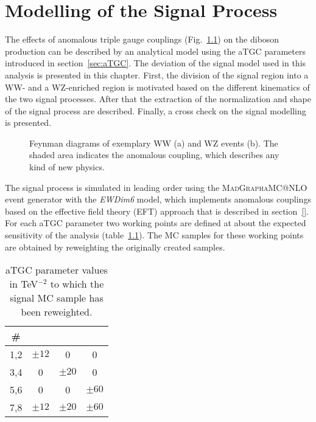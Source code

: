 \chapter{Modelling of the Signal Process}
\label{chap:signal}
The effects of anomalous triple gauge couplings (Fig.~\ref{fig:signal:fy_atgc}) on the diboson production can be described by an analytical model using the aTGC parameters introduced in section~\ref{sec:aTGC}. The deviation of the signal model used in this analysis is presented in this chapter. First, the division of the signal region into a WW- and a WZ-enriched region is motivated based on the different kinematics of the two signal processes. After that the extraction of the normalization and shape of the signal process are described. Finally, a cross check on the signal modelling is presented.\\
\begin{figure}
	\centering
	\caption[Feynman diagrams of two exemplary signal events]{Feynman diagrams of exemplary WW (a) and WZ events (b). The shaded area indicates the anomalous coupling, which describes any kind of new physics.}
	\label{fig:signal:fy_atgc}
\end{figure}

\noindent The signal process is simulated in leading order using the \textsc{MadGraph\textunderscore aMC@NLO} event generator with the \textit{EWDim6} model, which implements anomalous couplings based on the effective field theory (EFT) approach that is described in section~\ref{}. For each aTGC parameter two working points are defined at about the expected sensitivity of the analysis (table~\ref{tab:signal:aTGCpoints}). The MC samples for these working points are obtained by reweighting the originally created samples.
\begin{table}
	\centering
	\caption[aTGC working points]{aTGC parameter values in TeV$^{-2}$ to which the signal MC sample has been reweighted.}
	\label{tab:signal:aTGCpoints}
	\begin{tabular}{cccc}
	\hline
	\# & \Tcwww & \Tccw & \Tcb \\
	\hline
	1,2 &  $\pm 12$ & 0 & 0\\
	3,4 & 0 &  $\pm 20$ & 0\\
	5,6 & 0 & 0 &  $\pm 60$\\
	7,8 &	$\pm 12$ & $\pm 20$ & $\pm 60$\\
	\hline
	\end{tabular}
\end{table}

